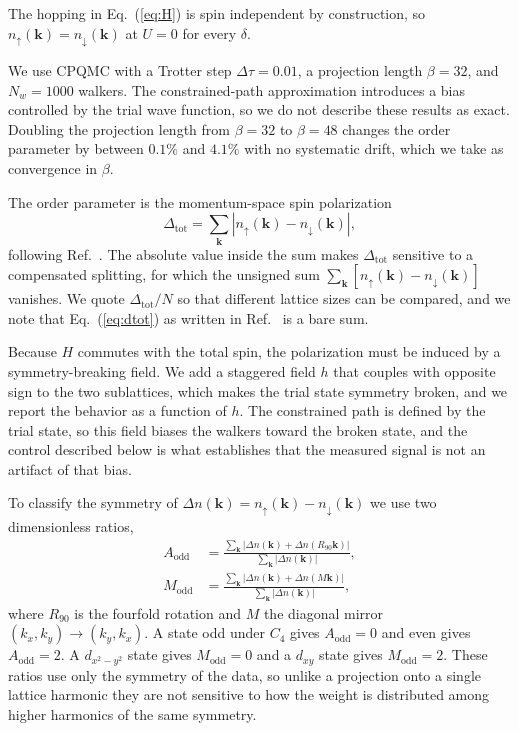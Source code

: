 \documentclass[aps,prb,reprint,superscriptaddress,amsmath,amssymb,floatfix]{revtex4-2}
\begin{document}
The hopping in Eq.~(\ref{eq:H}) is spin independent by construction, so
$n_{\uparrow}(\bm{k}) = n_{\downarrow}(\bm{k})$ at $U = 0$ for every $\delta$.

We use CPQMC with a Trotter step $\Delta\tau = 0.01$, a projection length
$\beta = 32$, and $N_w = 1000$ walkers. The constrained-path approximation
introduces a bias controlled by the trial wave function, so we do not describe
these results as exact. Doubling the projection length from $\beta = 32$ to
$\beta = 48$ changes the order parameter by between $0.1\%$ and $4.1\%$ with no
systematic drift, which we take as convergence in $\beta$.

The order parameter is the momentum-space spin polarization
\begin{equation}
\Delta_{\mathrm{tot}} = \sum_{\bm{k}} \left| n_{\uparrow}(\bm{k}) - n_{\downarrow}(\bm{k}) \right|,
\label{eq:dtot}
\end{equation}
following Ref.~\cite{OurPRB}. The absolute value inside the sum makes
$\Delta_{\mathrm{tot}}$ sensitive to a compensated splitting, for which the
unsigned sum $\sum_{\bm{k}} [n_{\uparrow}(\bm{k}) - n_{\downarrow}(\bm{k})]$
vanishes. We quote $\Delta_{\mathrm{tot}}/N$ so that different lattice sizes can
be compared, and we note that Eq.~(\ref{eq:dtot}) as written in
Ref.~\cite{OurPRB} is a bare sum.

Because $H$ commutes with the total spin, the polarization must be induced by a
symmetry-breaking field. We add a staggered field $h$ that couples with opposite
sign to the two sublattices, which makes the trial state symmetry broken, and we
report the behavior as a function of $h$. The constrained path is defined by the
trial state, so this field biases the walkers toward the broken state, and the
control described below is what establishes that the measured signal is not an
artifact of that bias.

To classify the symmetry of $\Delta n(\bm{k}) = n_{\uparrow}(\bm{k}) - n_{\downarrow}(\bm{k})$
we use two dimensionless ratios,
\begin{align}
A_{\mathrm{odd}} &= \frac{\sum_{\bm{k}} \left| \Delta n(\bm{k}) + \Delta n(R_{90}\bm{k}) \right|}
                         {\sum_{\bm{k}} \left| \Delta n(\bm{k}) \right|},
\label{eq:aodd}\\
M_{\mathrm{odd}} &= \frac{\sum_{\bm{k}} \left| \Delta n(\bm{k}) + \Delta n(M\bm{k}) \right|}
                         {\sum_{\bm{k}} \left| \Delta n(\bm{k}) \right|},
\label{eq:modd}
\end{align}
where $R_{90}$ is the fourfold rotation and $M$ the diagonal mirror
$(k_x,k_y) \to (k_y,k_x)$. A state odd under $C_4$ gives
$A_{\mathrm{odd}} = 0$ and even gives $A_{\mathrm{odd}} = 2$. A $d_{x^2-y^2}$
state gives $M_{\mathrm{odd}} = 0$ and a $d_{xy}$ state gives
$M_{\mathrm{odd}} = 2$. These ratios use only the symmetry of the data, so
unlike a projection onto a single lattice harmonic they are not sensitive to
how the weight is distributed among higher harmonics of the same symmetry.
\end{document}
